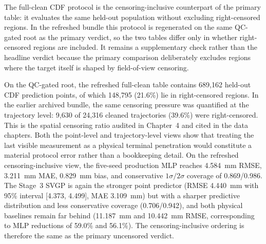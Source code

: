 The full-clean CDF protocol is the censoring-inclusive counterpart of the
primary table: it evaluates the same held-out population without excluding
right-censored regions. In the refreshed bundle this protocol is regenerated on
the same QC-gated root as the primary verdict, so the two tables differ only in
whether right-censored regions are included. It remains a supplementary check
rather than the headline verdict because the primary comparison deliberately
excludes regions where the target itself is shaped by field-of-view censoring.

On the QC-gated root, the refreshed full-clean table contains 689{,}162
held-out CDF prediction points, of which 148{,}795 (21.6\%) lie in
right-censored regions. In the earlier archived bundle, the same censoring
pressure was quantified at the trajectory level: 9{,}630 of 24{,}316 cleaned
trajectories (39.6\%) were right-censored. This is the spatial
censoring ratio audited in Chapter~4 and cited in the data chapters. Both the
point-level and trajectory-level views show that treating the last visible
measurement as a physical terminal penetration would constitute a material
protocol error rather than a bookkeeping detail. On the refreshed censoring-inclusive
view, the five-seed production MLP reaches \SI{4.584}{mm} RMSE, \SI{3.211}{mm}
MAE, \SI{+0.829}{mm} bias, and conservative \(1\sigma/2\sigma\) coverage of
0.869/0.986. The Stage~3 SVGP is again the stronger point predictor (RMSE
\SI{4.440}{mm} with 95\% interval [4.373, 4.499], MAE \SI{3.109}{mm}) but with
a sharper predictive distribution and less conservative coverage
(0.706/0.942), and both physical baselines
remain far behind (\SI{11.187}{mm} and \SI{10.442}{mm} RMSE, corresponding to
MLP reductions of 59.0\% and 56.1\%). The censoring-inclusive ordering is
therefore the same as the primary uncensored verdict.

